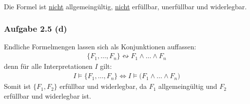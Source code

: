 Die Formel ist \underline{nicht} allgemeingültig, \underline{nicht} erfüllbar, unerfüllbar und widerlegbar.

\subsubsection{Aufgabe 2.5 (d)}
Endliche Formelmengen lassen sich als Konjunktionen auffassen:
\begin{align*}
	\lbrace F_1,\ldots,F_n\rbrace\leftrightsquigarrow
	F_1\wedge\ldots\wedge F_n
\end{align*}
denn für alle Interpretationen $I$ gilt:
\begin{align*}
	I\models \lbrace F_1,\ldots,F_n\rbrace
	\Longleftrightarrow
	I\models\big(F_1\wedge\ldots\wedge F_n\big)
\end{align*}
Somit ist $\lbrace F_1,F_2\rbrace$ erfüllbar und widerlegbar, da $F_1$ allgemeingültig und $F_2$ erfüllbar und widerlegbar ist.
